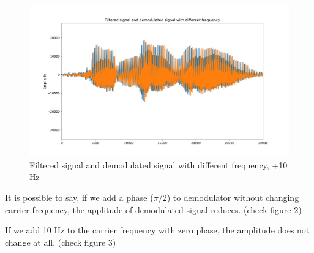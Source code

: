 \documentclass[11pt]{article}
\begin{document}
\begin{figure}[h]
	\centering
	\includegraphics[width=0.8\linewidth]{figure-2}
	\caption{Filtered signal and demodulated signal with different frequency, +10 Hz}
\end{figure}

It is possible to say, if we add a phase ($\pi / 2$) to demodulator without changing carrier frequency, the applitude of demodulated signal reduces. (check figure 2)

If we add 10 Hz to the carrier frequency with zero phase, the amplitude does not change at all. (check figure 3)
\end{document}

